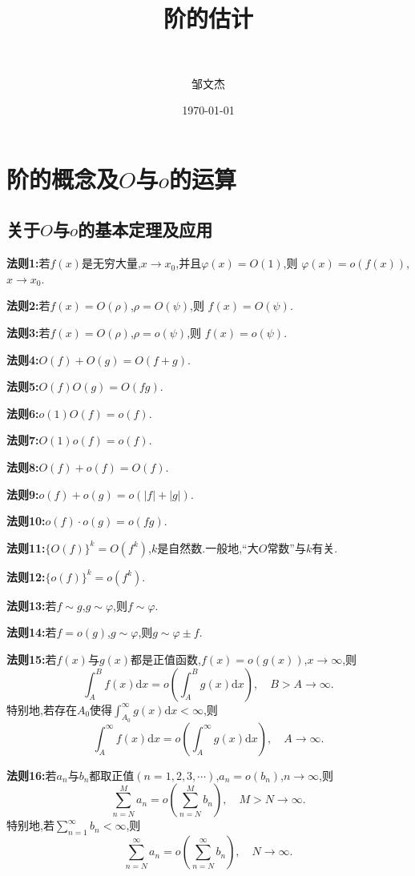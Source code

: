\documentclass[lang=cn,newtx,10pt,scheme=chinese]{../Template/elegantbook}
\title{阶的估计}
\subtitle{\,\,}
\author{邹文杰}
\institute{无}
\date{\today}
\begin{document}
\maketitle
\frontmatter

\tableofcontents

\mainmatter%

\chapter{阶的概念及$O$与$o$的运算}

\section{关于$O$与$o$的基本定理及应用}

\begin{theorem}[$O$与$o$的基本运算法则]\label{$O$与$o$的基本运算法则}
\textbf{法则1:}若\(f(x)\)是无穷大量,\(x\to x_0\),并且\(\varphi(x)=O(1)\),则
\(\varphi(x)=o(f(x))\),\(x\to x_0\).

\textbf{法则2:}若\(f(x)=O(\rho)\),\(\rho = O(\psi)\),则
\(f(x)=O(\psi)\).

\textbf{法则3:}若\(f(x)=O(\rho)\),\(\rho = o(\psi)\),则
\(f(x)=o(\psi)\).

\textbf{法则4:}\(O(f)+O(g)=O(f + g)\).

\textbf{法则5:}\(O(f)O(g)=O(fg)\).

\textbf{法则6:}\(o(1)O(f)=o(f)\).

\textbf{法则7:}\(O(1)o(f)=o(f)\).

\textbf{法则8:}\(O(f)+o(f)=O(f)\).

\textbf{法则9:}\(o(f)+o(g)=o(|f|+|g|)\).

\textbf{法则10:}\(o(f)\cdot o(g)=o(fg)\).

\textbf{法则11:}\(\{O(f)\}^k = O(f^k)\),\(k\)是自然数.一般地,“大\(O\)常数”与\(k\)有关.

\textbf{法则12:}\(\{o(f)\}^k = o(f^k)\).

\textbf{法则13:}若\(f\sim g\),\(g\sim\varphi\),则\(f\sim\varphi\).

\textbf{法则14:}若\(f = o(g)\),\(g\sim\varphi\),则\(g\sim\varphi\pm f\).

\textbf{法则15:}若\(f(x)\)与\(g(x)\)都是正值函数,\(f(x)=o(g(x))\),\(x\to\infty\),则
\[
\int_{A}^{B}f(x)\mathrm{d}x = o\left(\int_{A}^{B}g(x)\mathrm{d}x\right),\quad B > A\to\infty.
\]
特别地,若存在\(A_0\)使得\(\int_{A_0}^{\infty}g(x)\mathrm{d}x<\infty\),则
\[
\int_{A}^{\infty}f(x)\mathrm{d}x = o\left(\int_{A}^{\infty}g(x)\mathrm{d}x\right),\quad A\to\infty.
\]

\textbf{法则16:}若\(a_n\)与\(b_n\)都取正值\((n = 1,2,3,\cdots)\),\(a_n=o(b_n)\),\(n\to\infty\),则
\[
\sum_{n = N}^{M}a_n = o\left(\sum_{n = N}^{M}b_n\right),\quad M > N\to\infty.
\]
特别地,若\(\sum_{n = 1}^{\infty}b_n<\infty\),则
\[
\sum_{n = N}^{\infty}a_n = o\left(\sum_{n = N}^{\infty}b_n\right),\quad N\to\infty.
\]
\end{theorem}
\end{document}
